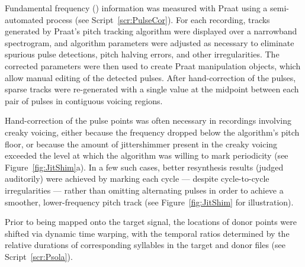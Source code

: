 Fundamental frequency (\fo) information was measured with Praat using a semi-automated process (see Script~\ref{scr:PulseCor}).  For each recording, \fo{} tracks generated by Praat’s pitch tracking algorithm were displayed over a narrowband spectrogram, and algorithm parameters were adjusted as necessary to eliminate spurious pulse detections, pitch halving errors, and other irregularities.  The corrected parameters were then used to create Praat manipulation objects, which allow manual editing of the detected pulses.  After hand-correction of the pulses, sparse \fo{} tracks were re-generated with a single value at the midpoint between each pair of pulses in contiguous voicing regions.

Hand-correction of the pulse points was often necessary in recordings involving creaky voicing, either because the frequency dropped below the algorithm’s pitch floor, or because the amount of jitter\slsh{}shimmer present in the creaky voicing exceeded the level at which the algorithm was willing to mark periodicity (see Figure~\ref{fig:JitShim}a).  In a few such cases, better resynthesis results (judged auditorily) were achieved by marking each cycle — despite cycle-to-cycle irregularities — rather than omitting alternating pulses in order to achieve a smoother, lower-frequency pitch track (see Figure~\ref{fig:JitShim} for illustration).  %

Prior to being mapped onto the target signal, the locations of donor \fo{} points were shifted via dynamic time warping, with the temporal ratios determined by the relative durations of corresponding syllables in the target and donor files (see Script~\ref{scr:Psola}).

